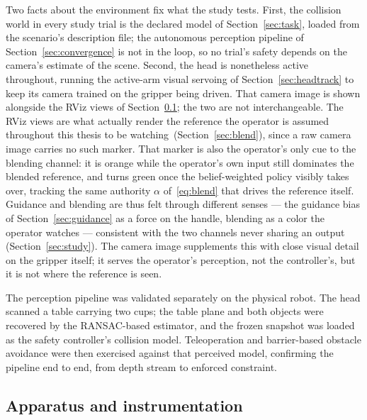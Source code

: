 \documentclass[12pt,a4paper,twoside,openright]{report}
\begin{document}
Two facts about the environment fix what the study tests. First, the collision world in every study trial is the declared model of Section~\ref{sec:task}, loaded from the scenario's description file; the autonomous perception pipeline of Section~\ref{sec:convergence} is not in the loop, so no trial's safety depends on the camera's estimate of the scene. Second, the head is nonetheless active throughout, running the active-arm visual servoing of Section~\ref{sec:headtrack} to keep its camera trained on the gripper being driven. That camera image is shown alongside the RViz views of Section~\ref{sec:studyapparatus}; the two are not interchangeable. The RViz views are what actually render the reference the operator is assumed throughout this thesis to be watching~(Section~\ref{sec:blend}), since a raw camera image carries no such marker. That marker is also the operator's only cue to the blending channel: it is orange while the operator's own input still dominates the blended reference, and turns green once the belief-weighted policy visibly takes over, tracking the same authority $\alpha$ of~\eqref{eq:blend} that drives the reference itself. Guidance and blending are thus felt through different senses --- the guidance bias of Section~\ref{sec:guidance} as a force on the handle, blending as a color the operator watches --- consistent with the two channels never sharing an output (Section~\ref{sec:study}). The camera image supplements this with close visual detail on the gripper itself; it serves the operator's perception, not the controller's, but it is not where the reference is seen.

The perception pipeline was validated separately on the physical robot. The head scanned a table carrying two cups; the table plane and both objects were recovered by the RANSAC-based estimator, and the frozen snapshot was loaded as the safety controller's collision model. Teleoperation and barrier-based obstacle avoidance were then exercised against that perceived model, confirming the pipeline end to end, from depth stream to enforced constraint.

\subsection{Apparatus and instrumentation}
\label{sec:studyapparatus}
\end{document}
